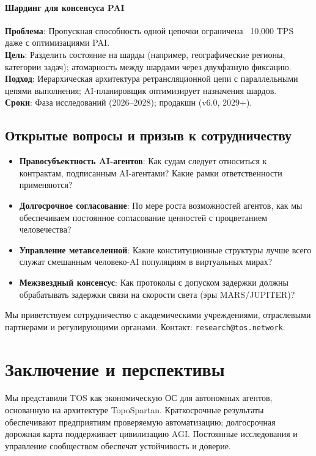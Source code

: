 \documentclass[11pt]{article}
\begin{document}
\paragraph{Шардинг для консенсуса PAI}
\textbf{Проблема}: Пропускная способность одной цепочки ограничена ~10,000 TPS даже с оптимизациями PAI.\\
\textbf{Цель}: Разделить состояние на шарды (например, географические регионы, категории задач); атомарность между шардами через двухфазную фиксацию.\\
\textbf{Подход}: Иерархическая архитектура ретрансляционной цепи с параллельными цепями выполнения; AI-планировщик оптимизирует назначения шардов.\\
\textbf{Сроки}: Фаза исследований (2026--2028); продакшн (v6.0, 2029+).

\subsection{Открытые вопросы и призыв к сотрудничеству}

\begin{itemize}[noitemsep]
  \item \textbf{Правосубъектность AI-агентов}: Как судам следует относиться к контрактам, подписанным AI-агентами? Какие рамки ответственности применяются?
  \item \textbf{Долгосрочное согласование}: По мере роста возможностей агентов, как мы обеспечиваем постоянное согласование ценностей с процветанием человечества?
  \item \textbf{Управление метавселенной}: Какие конституционные структуры лучше всего служат смешанным человеко-AI популяциям в виртуальных мирах?
  \item \textbf{Межзвездный консенсус}: Как протоколы с допуском задержки должны обрабатывать задержки связи на скорости света (эры MARS/JUPITER)?
\end{itemize}

Мы приветствуем сотрудничество с академическими учреждениями, отраслевыми партнерами и регулирующими органами. Контакт: \texttt{research@tos.network}.

\section{Заключение и перспективы}
Мы представили TOS как экономическую ОС для автономных агентов, основанную на архитектуре TopoSpartan. Краткосрочные результаты обеспечивают предприятиям проверяемую автоматизацию; долгосрочная дорожная карта поддерживает цивилизацию AGI. Постоянные исследования и управление сообществом обеспечат устойчивость и доверие.
\end{document}
